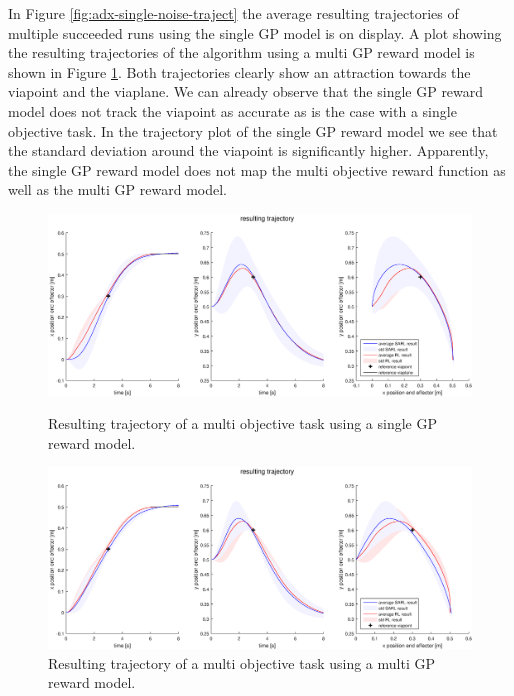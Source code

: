 \documentclass[mscThesis.tex]{subfiles}
\begin{document}
In Figure \ref{fig:adx-single-noise-traject} the average resulting trajectories of multiple succeeded runs using the single GP model is on display. A plot showing the resulting trajectories of the algorithm using a multi GP reward model is shown in Figure \ref{fig:adx-multi-noise-traject}. Both trajectories clearly show an attraction towards the viapoint and the viaplane. We can already observe that the single GP reward model does not track the viapoint as accurate as is the case with a single objective task. In the trajectory plot of the single GP reward model we see that the standard deviation around the viapoint is significantly higher. Apparently, the single GP reward model does not map the multi objective reward function as well as the multi GP reward model. 

\begin{figure}[!htb]
    \begin{minipage}[b]{\linewidth}
        \centering
        \includegraphics[width=\textwidth, height = 6 cm]{figures/results/advancedx/trajectory_single_noise_sum.eps}
        \caption{Resulting trajectory of a multi objective task using a single GP reward model.}
        \label{fig:adx-single-noise-traject}
        \vspace{4ex}
    \end{minipage}%
    
    \begin{minipage}[b]{\linewidth}
        \centering
        \includegraphics[width=\textwidth, height = 6 cm]{figures/results/advancedx/trajectory_multi_noise_sum.eps}
        \caption{Resulting trajectory of a multi objective task using a multi GP reward model.}
        \label{fig:adx-multi-noise-traject}
    \end{minipage}%
\end{figure}
\end{document}
